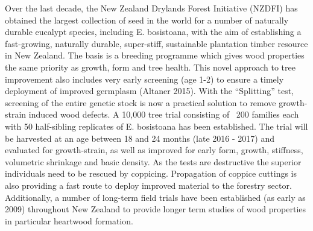 Over the last decade, the New Zealand Drylands Forest Initiative (NZDFI) has obtained the largest collection of seed in the world for a number of naturally durable eucalypt species, including E. bosistoana, with the aim of establishing a fast-growing, naturally durable, super-stiff, sustainable plantation timber resource in New Zealand. The basis is a breeding programme which gives wood properties the same priority as growth, form and tree health. This novel approach to tree improvement also includes very early screening (age 1-2) to ensure a timely deployment of improved germplasm (Altaner 2015). With the “Splitting” test, screening of the entire genetic stock is now a practical solution to remove growth-strain induced wood defects. A 10,000 tree trial consisting of ~200 families each with 50 half-sibling replicates of E. bosistoana has been established. The trial will be harvested at an age between 18 and 24 months (late 2016 - 2017) and evaluated for growth-strain, as well as improved for early form, growth, stiffness, volumetric shrinkage and basic density. As the tests are destructive the superior individuals need to be rescued by coppicing. Propagation of coppice cuttings is also providing a fast route to deploy improved material to the forestry sector. Additionally, a number of long-term field trials have been established (as early as 2009) throughout New Zealand to provide longer term studies of wood properties in particular heartwood formation. 